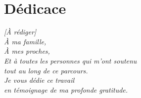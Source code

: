 \chapter*{Dédicace}
\thispagestyle{empty}

\vspace*{1.5cm}

\begin{flushright}
\textit{%
\textit{[À rédiger]}\\[1.5em]
À ma famille,\\
À mes proches,\\
Et à toutes les personnes qui m'ont soutenu\\
tout au long de ce parcours.\\[1.5em]
Je vous dédie ce travail\\
en témoignage de ma profonde gratitude.
}
\end{flushright}

\vspace{2.5cm}
\begin{flushright}
\textbf{\Auteur}
\end{flushright}
\clearpage
